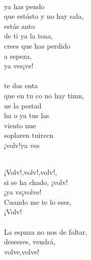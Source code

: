 \begin{cancion}%
	  \\
	ya has pendo\\
	que estásto y no hay sala,\\
	estás anto \\
	de ti ya la toaa,\\
	crees que  has perdido\\
	a  espeza,\\
	ya ves¡ve! \\
\jump\\
	te das enta\\
	que en tu co no hay timn,\\
	ue la pestad \\
	ha o ya tus las\\
	viento nue \\
	soplaren tuirecn \\
	¡volv!ya ves\\\jump\\
	\begin{chorus}%
	¡Volv!,volv!,volv!,     \\
	si se ha chado, ¡volv!\\
	¡ya vs¡volve!\\
	Cuando me te lo eses,\\
	¡Volv!\\
\jump\\
	La espnza no nos  de faltar,\\
	desesres, vendrá,\\
	volve,volve!\\

\end{chorus}
\end{cancion}
